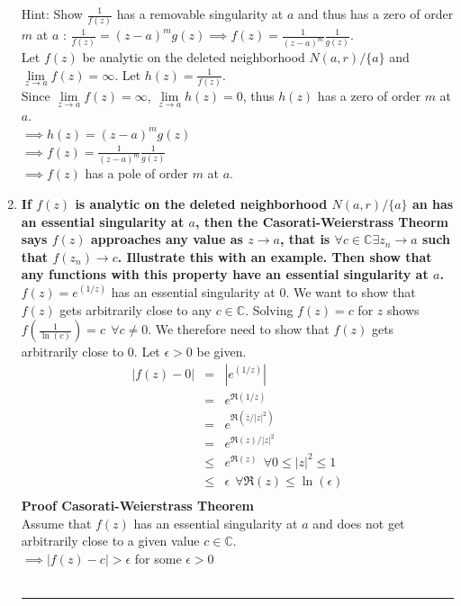 \documentclass{article}%
\newcommand\abs[1]{\left|#1\right|}
\newenvironment{proof}[1][]{\textbf{Proof #1} \\ }{\\ \rule{0.5em}{0.5em}  \\}
\begin{document}
\begin{enumerate}
{            Hint: Show $\frac{1}{f(z)}$ has a removable singularity at $a$ and thus has a zero of order $m$ at $a$ : 
            $\frac{1}{f(z)} = (z-a)^m g(z) \implies f(z)= \frac{1}{(z-a)^m}\frac{1}{g(z)}$.} \\
    Let $f(z)$ be analytic on the deleted neighborhood $N(a,r)/\{a\}$ and $\lim\limits_{z\to a}f(z)=\infty$.  Let $h(z) = \frac{1}{f(z)}$. \\
    Since $\lim\limits_{z\to a}f(z)=\infty$, $\lim\limits_{z\to a}h(z)=0$, thus $h(z)$ has a zero of order $m$ at $a$. \\
    $\implies h(z)=(z-a)^mg(z)$ \\
    $\implies f(z) = \frac{1}{(z-a)^m}\frac{1}{g(z)}$ \\
    $\implies f(z)$ has a pole of order $m$ at $a$.
    \item %
    \textbf{If $f(z)$ is analytic on the deleted neighborhood $N(a,r)/\{a\}$ an has an essential singularity at $a$, then the Casorati-Weierstrass
            Theorm says $f(z)$ approaches any value as $z\to a$, that is $\forall c\in \mathbb{C} \exists z_n \to a$ such that $f(z_n)\to c$.
            Illustrate this with an example. Then show that any functions with this property have an essential singularity at $a$.} \\
    $f(z)=e^{(1/z)}$ has an essential singularity at $0$. We want to show that $f(z)$ gets arbitrarily close to any $c \in \mathbb{C}$. 
    Solving $f(z)=c$ for $z$ shows $f(\frac{1}{\ln(c)}) = c~~\forall c\neq 0$. We therefore need to show that $f(z)$ gets arbitrarily close to $0$.
    Let $\epsilon>0$ be given.
    \begin{eqnarray*}
        \abs{f(z)-0} &=& \abs{e^{(1/z)}} \\
            &=& e^{\Re(1/z)} \\
            &=& e^{\Re(\bar{z}/\abs{z}^2)} \\
            &=& e^{\Re(z)/\abs{z}^2} \\
            &\leq& e^{\Re(z)} ~~\forall 0\leq\abs{z}^2 \leq 1 \\
            &\leq& \epsilon ~~\forall \Re(z)\leq\ln(\epsilon) \\
    \end{eqnarray*}
    \begin{proof}[Casorati-Weierstrass Theorem]
        Assume that $f(z)$ has an essential singularity at $a$ and does not get arbitrarily close to a given value $c \in \mathbb{C}$. \\
        $\implies \abs{f(z)-c} >\epsilon$ for some $\epsilon>0$ \\

\end{proof}
\end{enumerate}
\end{document}
